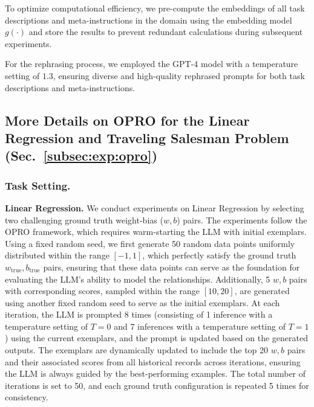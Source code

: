 To optimize computational efficiency, we pre-compute the embeddings of all task descriptions and meta-instructions in the domain using the embedding model $g(\cdot)$ and store the results to prevent redundant calculations during subsequent experiments. 

For the rephrasing process, we employed 
the GPT-4 model
with a temperature setting of \(1.3\), ensuring diverse and high-quality rephrased prompts for both task descriptions and meta-instructions.



\subsection{More Details on OPRO for the Linear Regression and Traveling Salesman Problem (Sec.~\ref{subsec:exp:opro})}

\subsubsection{Task Setting.}
\textbf{Linear Regression.} We conduct experiments on Linear Regression by selecting two challenging ground truth weight-bias (\(w, b\)) pairs. The experiments follow the OPRO framework, which requires warm-starting the LLM with initial exemplars. Using a fixed random seed, we first generate 50 random data points uniformly distributed within the range \([-1, 1]\), which perfectly satisfy the ground truth \(w_{\text{true}}, b_{\text{true}}\) pairs, ensuring that these data points can serve as the foundation for evaluating the LLM’s ability to model the relationships. Additionally, 5 \(w, b\) pairs with corresponding scores, sampled within the range \([10, 20]\), are generated using another fixed random seed to serve as the initial exemplars. At each iteration, the LLM is prompted 8 times (consisting of 1 inference with a temperature setting of $T=0$ and 7 inferences with a temperature setting of $T=1$) using the current exemplars, and the prompt is updated based on the generated outputs. The exemplars are dynamically updated to include the top 20 \(w, b\) pairs and their associated scores from all historical records across iterations, ensuring the LLM is always guided by the best-performing examples. The total number of iterations is set to 50, and each ground truth configuration is repeated 5 times for consistency.


